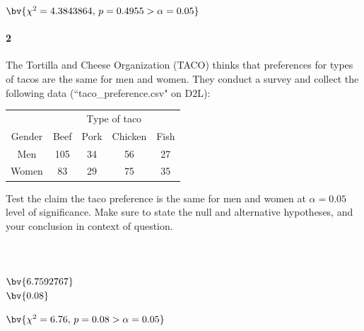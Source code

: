 \documentclass{article}
\begin{document}
\begin{flushleft}
\begin{enumalpha}
$\bv{\chi^2 = 4.3843864, \, p = 0.4955 > \alpha = 0.05}$\\

\end{enumalpha}



\newpage
\paragraph{2} The Tortilla and Cheese Organization (TACO) thinks that preferences for types of tacos are the same for men and women. They conduct a survey and collect the following data (``taco\_preference.csv" on D2L):\\
\medskip
{\centering
\begin{tabular}{c | c  c c c}
\multicolumn{1}{c}{} & \multicolumn{4}{c}{\large Type of taco}\\
Gender & Beef & Pork & Chicken & Fish\\
\hline
Men & 105 & 34 & 56 & 27\\
Women & 83 & 29 & 75 & 35 \\
\end{tabular}
\par}
\bigskip
Test the claim the taco preference is the same for men and women at $\alpha = 0.05$ level of significance. Make sure to state the null and alternative hypotheses, and your conclusion in context of question.\\
\medskip
{}\\
\\
\medskip
{}\\
$\bv{6.7592767}$\\
$\bv{0.08}$\\
\medskip

$\bv{\chi^2 = 6.76, \, p = 0.08 > \alpha = 0.05}$\\


\vspace{3.25in}



\end{flushleft}
\end{document}
